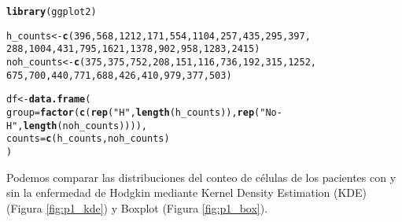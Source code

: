 \documentclass[paper=letter, fontsize=11pt]{scrartcl}\usepackage[]{graphicx}\usepackage[]{xcolor}
\makeatletter
\newcommand{\hlnum}[1]{\textcolor[rgb]{0.686,0.059,0.569}{#1}}%
\newcommand{\hlsng}[1]{\textcolor[rgb]{0.192,0.494,0.8}{#1}}%
\newcommand{\hldef}[1]{\textcolor[rgb]{0.345,0.345,0.345}{#1}}%
\newcommand{\hlkwb}[1]{\textcolor[rgb]{0.69,0.353,0.396}{#1}}%
\newcommand{\hlkwc}[1]{\textcolor[rgb]{0.333,0.667,0.333}{#1}}%
\newcommand{\hlkwd}[1]{\textcolor[rgb]{0.737,0.353,0.396}{\textbf{#1}}}%
\newenvironment{kframe}{%
 \def\at@end@of@kframe{}%
 \ifinner\ifhmode%
  \def\at@end@of@kframe{\end{minipage}}%
  \begin{minipage}{\columnwidth}%
 \fi\fi%
 \def\FrameCommand##1{\hskip\@totalleftmargin \hskip-\fboxsep
 \colorbox{shadecolor}{##1}\hskip-\fboxsep
     \hskip-\linewidth \hskip-\@totalleftmargin \hskip\columnwidth}%
 \MakeFramed {\advance\hsize-\width
   \@totalleftmargin\z@ \linewidth\hsize
   \@setminipage}}%
 {\par\unskip\endMakeFramed%
 \at@end@of@kframe}
\newenvironment{knitrout}{}{} %
\numberwithin{equation}{problemcounter} %
\numberwithin{figure}{problemcounter} %
\numberwithin{table}{problemcounter} %
\numberwithin{subsection}{problemcounter}
\makeatother
\begin{document}
\begin{knitrout}
\color{fgcolor}\begin{kframe}
\begin{alltt}
\hlkwd{library}\hldef{(ggplot2)}

\hldef{h_counts} \hlkwb{<-} \hlkwd{c}\hldef{(}\hlnum{396}\hldef{,} \hlnum{568}\hldef{,} \hlnum{1212}\hldef{,} \hlnum{171}\hldef{,} \hlnum{554}\hldef{,} \hlnum{1104}\hldef{,} \hlnum{257}\hldef{,} \hlnum{435}\hldef{,} \hlnum{295}\hldef{,} \hlnum{397}\hldef{,}
              \hlnum{288}\hldef{,} \hlnum{1004}\hldef{,} \hlnum{431}\hldef{,} \hlnum{795}\hldef{,} \hlnum{1621}\hldef{,} \hlnum{1378}\hldef{,} \hlnum{902}\hldef{,} \hlnum{958}\hldef{,} \hlnum{1283}\hldef{,} \hlnum{2415}\hldef{)}
\hldef{noh_counts} \hlkwb{<-} \hlkwd{c}\hldef{(}\hlnum{375}\hldef{,} \hlnum{375}\hldef{,} \hlnum{752}\hldef{,} \hlnum{208}\hldef{,} \hlnum{151}\hldef{,} \hlnum{116}\hldef{,} \hlnum{736}\hldef{,} \hlnum{192}\hldef{,} \hlnum{315}\hldef{,} \hlnum{1252}\hldef{,}
                \hlnum{675}\hldef{,} \hlnum{700}\hldef{,} \hlnum{440}\hldef{,} \hlnum{771}\hldef{,} \hlnum{688}\hldef{,} \hlnum{426}\hldef{,} \hlnum{410}\hldef{,} \hlnum{979}\hldef{,} \hlnum{377}\hldef{,} \hlnum{503}\hldef{)}

\hldef{df} \hlkwb{<-} \hlkwd{data.frame}\hldef{(}
\hlkwc{group} \hldef{=} \hlkwd{factor}\hldef{(}\hlkwd{c}\hldef{(}\hlkwd{rep}\hldef{(}\hlsng{"H"}\hldef{,} \hlkwd{length}\hldef{(h_counts)),} \hlkwd{rep}\hldef{(}\hlsng{"No-H"}\hldef{,} \hlkwd{length}\hldef{(noh_counts)))),}
  \hlkwc{counts} \hldef{=} \hlkwd{c}\hldef{(h_counts, noh_counts)}
\hldef{)}
\end{alltt}
\end{kframe}
\end{knitrout}

Podemos comparar las distribuciones del conteo de células de los pacientes con y sin la enfermedad de Hodgkin mediante Kernel Density Estimation (KDE) (Figura \ref{fig:p1_kde}) y Boxplot (Figura \ref{fig:p1_box}).
\end{document}
